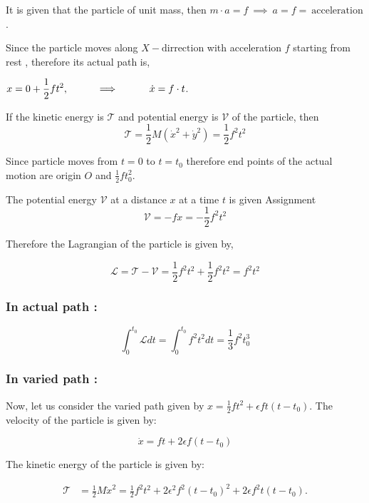 \documentclass[12pt, a4paper]{article} %
\begin{document}
\BgThispage

It is given that the particle of unit mass, then $m\cdot a = f\ \implies\ a = f =\  \mbox{acceleration}$.

Since the particle moves along $X-\mbox{dirrection}$ with acceleration $f$ starting from rest , therefore its actual path is,
\begin{center}
    $\displaystyle x = 0 + \frac{1}{2}ft^2, \hspace*{1cm}\implies\hspace*{1cm} \dot{x} = f\cdot t$.
\end{center}

If the kinetic energy is $\mathcal{T}$ and potential energy is $\mathcal{V}$ of the particle, then 
\[\mathcal{T} = \frac{1}{2}M(\dot{x}^2 + \dot{y}^2) = \frac{1}{2}f^2t^2\]

Since particle moves from $t = 0$ to $t = t_0$ therefore end points of the actual motion are origin $O$ and $\displaystyle \frac{1}{2}ft^2_0$.

The potential energy $\mathcal{V}$ at a distance $x$ at a time $t$ is given Assignment
\[\mathcal{V} = -fx = -\frac{1}{2}f^2t^2\]

Therefore the Lagrangian of the particle is given by,

\[\mathscr{L} = \mathcal{T - V} = \frac{1}{2}f^2t^2 + \frac{1}{2}f^2t^2 = f^2t^2\]

\subsubsection*{In actual path :}

\[\int_{0}^{t_0}\mathscr{L}dt = \int_{0}^{t_0}f^2t^2dt = \frac{1}{3}f^2t^3_0\]

\subsubsection*{In varied path :}

Now, let us consider the varied path given by $\displaystyle x = \frac{1}{2}ft^2 + \epsilon f t\left(t-t_0\right)$. The velocity of the particle is given by:

\[\dot{x} = ft + 2\epsilon f (t-t_0)\]

The kinetic energy of the particle is given by:

\begin{align*}
    \mathcal{T} &= \frac{1}{2}M\dot{x}^2 = \frac{1}{2}f^2t^2 + 2\epsilon^2f^2\left(t-t_0\right)^2 + 2\epsilon f^2t\left(t-t_0\right).
\end{align*}
\end{document}
